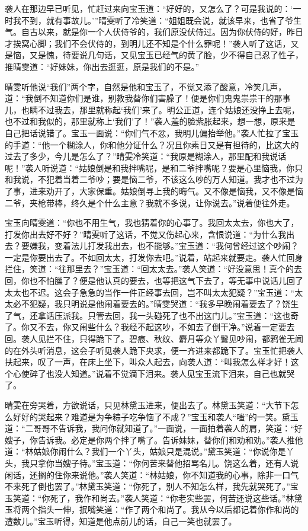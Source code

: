 袭人在那边早已听见，忙赶过来向宝玉道：“好好的，又怎么了？可是我说的：‘一时我不到，就有事故儿。’”晴雯听了冷笑道：“姐姐既会说，就该早来，也省了爷生气。自古以来，就是你一个人伏侍爷的，我们原没伏侍过。因为你伏侍的好，昨日才挨窝心脚；我们不会伏侍的，到明儿还不知是个什么罪呢！”袭人听了这话，又是恼，又是愧，待要说几句话，又见宝玉已经气的黄了脸，少不得自己忍了性子，推晴雯道：“好妹妹，你出去逛逛，原是我们的不是。”

晴雯听他说“我们”两个字，自然是他和宝玉了，不觉又添了酸意，冷笑几声，道：“我倒不知道你们是谁，别教我替你们害臊了！便是你们鬼鬼祟祟干的那事儿，也瞒不过我去，那里就称起‘我们’来了。明公正道，连个姑娘还没挣上去呢，也不过和我似的，那里就称上‘我们’了！”袭人羞的脸紫胀起来，想一想，原来是自己把话说错了。宝玉一面说：“你们气不忿，我明儿偏抬举他。”袭人忙拉了宝玉的手道：“他一个糊涂人，你和他分证什么？况且你素日又是有担待的，比这大的过去了多少，今儿是怎么了？”晴雯冷笑道：“我原是糊涂人，那里配和我说话呢！”袭人听说道：“姑娘倒是和我拌嘴呢，是和二爷拌嘴呢？要是心里恼我，你只和我说，不犯着当着二爷吵；要是恼二爷，不该这么吵的万人知道。我才也不过为了事，进来劝开了，大家保重。姑娘倒寻上我的晦气。又不像是恼我，又不像是恼二爷，夹枪带棒，终久是个什么主意？我就不多说，让你说去。”说着便往外走。

宝玉向晴雯道：“你也不用生气，我也猜着你的心事了。我回太太去，你也大了，打发你出去好不好？”晴雯听了这话，不觉又伤起心来，含恨说道：“为什么我出去？要嫌我，变着法儿打发我出去，也不能够。”宝玉道：“我何曾经过这个吵闹？一定是你要出去了。不如回太太，打发你去吧。”说着，站起来就要走。袭人忙回身拦住，笑道：“往那里去？”宝玉道：“回太太去。”袭人笑道：“好没意思！真个的去回，你也不怕臊了？便是他认真的要去，也等把这气下去了，等无事中说话儿回了太太也不迟。这会子急急的当作一件正经事去回，岂不叫太太犯疑？”宝玉道：“太太必不犯疑，我只明说是他闹着要去的。”晴雯哭道：“我多早晚闹着要去了？饶生了气，还拿话压派我。只管去回，我一头碰死了也不出这门儿。”宝玉道：“这也奇了。你又不去，你又闹些什么？我经不起这吵，不如去了倒干净。”说着一定要去回。袭人见拦不住，只得跪下了。碧痕、秋纹、麝月等众丫鬟见吵闹，都鸦雀无闻的在外头听消息，这会子听见袭人跪下央求，便一齐进来都跪下了。宝玉忙把袭人扶起来，叹了一声，在床上坐下，叫众人起去，向袭人道：“叫我怎么样才好！这个心使碎了也没人知道。”说着不觉滴下泪来。袭人见宝玉流下泪来，自己也就哭了。

晴雯在旁哭着，方欲说话，只见林黛玉进来，便出去了。林黛玉笑道：“大节下怎么好好的哭起来？难道是为争粽子吃争恼了不成？”宝玉和袭人“嗤”的一笑。黛玉道：“二哥哥不告诉我，我问你就知道了。”一面说，一面拍着袭人的肩，笑道：“好嫂子，你告诉我。必定是你两个拌了嘴了。告诉妹妹，替你们和劝和劝。”袭人推他道：“林姑娘你闹什么？我们一个丫头，姑娘只是混说。”黛玉笑道：“你说你是丫头，我只拿你当嫂子待。”宝玉道：“你何苦来替他招骂名儿。饶这么着，还有人说闲话，还搁的住你来说他。”袭人笑道：“林姑娘，你不知道我的心事，除非一口气不来死了倒也罢了。”林黛玉笑道：“你死了，别人不知怎么样，我先就哭死了。”宝玉笑道：“你死了，我作和尚去。”袭人笑道：“你老实些罢，何苦还说这些话。”林黛玉将两个指头一伸，抿嘴笑道：“作了两个和尚了。我从今以后都记着你作和尚的遭数儿。”宝玉听得，知道是他点前儿的话，自己一笑也就罢了。


